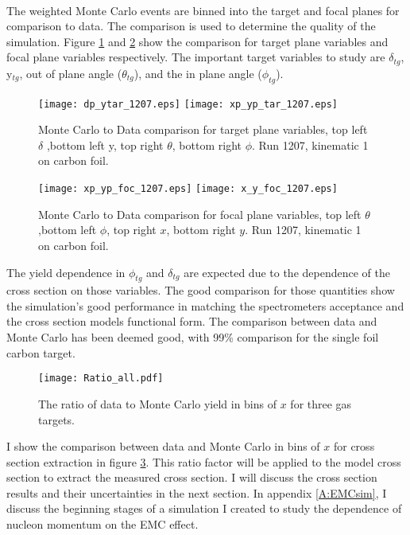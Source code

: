 \paragraph{}The weighted Monte Carlo events are binned into the target and focal planes for comparison to data. The comparison is used to determine the quality of the simulation. Figure \ref{tcomp} and \ref{fcomp} show the comparison for target plane variables and focal plane variables respectively. The important target variables to study are $\delta_{tg}$, y$_{tg}$, out of plane angle ($\theta_{tg}$), and the in plane angle ($\phi_{tg}$). 
\begin{figure}[t]
	\texttt{[image: dp\_ytar\_1207.eps]}
	\texttt{[image: xp\_yp\_tar\_1207.eps]}
	\caption{Monte Carlo to Data comparison for target plane variables, top left $\delta$ ,bottom left y, top right $\theta$, bottom right $\phi$. Run 1207, kinematic 1 on carbon foil.\label{tcomp}}

\end{figure}
\begin{figure}[t]
	{\centering
	\hspace{-10pt}
	\texttt{[image: xp\_yp\_foc\_1207.eps]}
	\texttt{[image: x\_y\_foc\_1207.eps]}}
	\caption{Monte Carlo to Data comparison for focal plane variables, top left $\theta$ ,bottom left $\phi$, top right $x$, bottom right $y$. Run 1207, kinematic 1 on carbon foil. \label{fcomp} }
\end{figure}
The yield dependence in $\phi_{tg}$ and $\delta_{tg}$ are expected due to the dependence of the cross section on those variables. The good comparison for those quantities show the simulation's good performance in matching the spectrometers acceptance and the cross section models functional form. The comparison between data and Monte Carlo has been deemed good, with 99\% comparison for the single foil carbon target. 
\begin{figure}
	\texttt{[image: Ratio\_all.pdf]}
		\caption{The ratio of data to Monte Carlo yield in bins of $x$ for three gas targets.\label{D_MC_COMP}}
\end{figure}
I show the comparison between data and Monte Carlo in bins of $x$ for cross section extraction in figure \ref{D_MC_COMP}. This ratio factor will be applied to the model cross section to extract the measured cross section. I will discuss the cross section results and their uncertainties in the next section. In appendix \ref{A:EMCsim}, I discuss the beginning stages of a simulation I created to study the dependence of nucleon momentum on the EMC effect. 
